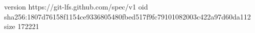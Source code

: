 version https://git-lfs.github.com/spec/v1
oid sha256:1807d76158f1154ce9336805480fbed517f9fc79101082003c422a97d60da112
size 172221
